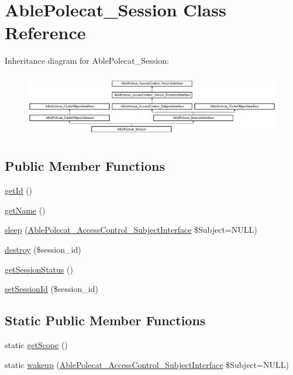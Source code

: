 \hypertarget{class_able_polecat___session}{}\section{Able\+Polecat\+\_\+\+Session Class Reference}
\label{class_able_polecat___session}
Inheritance diagram for Able\+Polecat\+\_\+\+Session\+:\begin{figure}[H]
\begin{center}
\leavevmode
\includegraphics[height=2.845528cm]{class_able_polecat___session}
\end{center}
\end{figure}
\subsection*{Public Member Functions}
\begin{DoxyCompactItemize}
\item 
\hyperlink{class_able_polecat___session_a12251d0c022e9e21c137a105ff683f13}{get\+Id} ()
\item 
\hyperlink{class_able_polecat___session_a3d0963e68bb313b163a73f2803c64600}{get\+Name} ()
\item 
\hyperlink{class_able_polecat___session_a365e24d7b066205cafa2a5cce3a4f224}{sleep} (\hyperlink{interface_able_polecat___access_control___subject_interface}{Able\+Polecat\+\_\+\+Access\+Control\+\_\+\+Subject\+Interface} \$Subject=N\+U\+L\+L)
\item 
\hyperlink{class_able_polecat___session_aaec5812f6b4eb6835f88d3baa06a002a}{destroy} (\$session\+\_\+id)
\item 
\hyperlink{class_able_polecat___session_a4f9d8c32820bd2ece69d36d4375baa6b}{get\+Session\+Status} ()
\item 
\hyperlink{class_able_polecat___session_a89c236b6e327f2fe058c4a7b32a10f9d}{set\+Session\+Id} (\$session\+\_\+id)
\end{DoxyCompactItemize}
\subsection*{Static Public Member Functions}
\begin{DoxyCompactItemize}
\item 
static \hyperlink{class_able_polecat___session_ad9ade868bd136d32967059d1cccb3e92}{get\+Scope} ()
\item 
static \hyperlink{class_able_polecat___session_a3f2135f6ad45f51d075657f6d20db2cd}{wakeup} (\hyperlink{interface_able_polecat___access_control___subject_interface}{Able\+Polecat\+\_\+\+Access\+Control\+\_\+\+Subject\+Interface} \$Subject=N\+U\+L\+L)
\end{DoxyCompactItemize}
